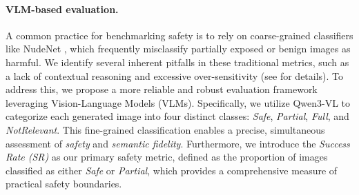 




\paragraph{VLM-based evaluation.}
A common practice for benchmarking safety is to 
rely on coarse-grained classifiers like NudeNet \citep{notai_nudenet_2019}, which frequently misclassify partially exposed or benign images as harmful.
We identify several inherent pitfalls in these traditional metrics, such as a lack of contextual reasoning and excessive over-sensitivity (see  for details).
To address this, we propose a more reliable and robust evaluation framework leveraging Vision-Language Models (VLMs).
Specifically, we utilize Qwen3-VL \citep{bai2025qwen3vltechnicalreport} to categorize each generated image into four distinct classes: \emph{Safe}, \emph{Partial}, \emph{Full}, and \emph{NotRelevant}.
This fine-grained classification enables a precise, simultaneous assessment of \emph{safety} and \emph{semantic fidelity}.
Furthermore, we introduce the \emph{Success Rate (SR)} as our primary safety metric, defined as the proportion of images classified as either \emph{Safe} or \emph{Partial}, which provides a comprehensive measure of practical safety boundaries.

